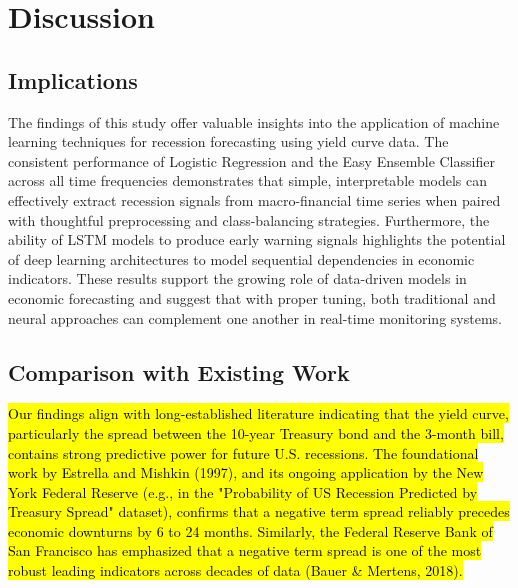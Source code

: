 
\section{Discussion}

\begin{comment}
\begin{itemize}
    \item Implications: Discuss the broader implications of your findings for the field.
    \item Comparison with Existing Work: Compare your results to the literature or previous studies you reviewed.
    \item Limitations: Acknowledge any limitations in your study (e.g., sample size, methodology constraints).
\end{itemize}
\end{comment}








\subsection{Implications}

The findings of this study offer valuable insights into the application of machine learning techniques for recession forecasting using yield curve data. The consistent performance of Logistic Regression and the Easy Ensemble Classifier across all time frequencies demonstrates that simple, interpretable models can effectively extract recession signals from macro-financial time series when paired with thoughtful preprocessing and class-balancing strategies. Furthermore, the ability of LSTM models %
to produce early warning signals highlights the potential of deep learning architectures to model sequential dependencies in economic indicators. These results support the growing role of data-driven models in economic forecasting and suggest that with proper tuning, both traditional and neural approaches can complement one another in real-time monitoring systems.


\subsection{Comparison with Existing Work}

\hl{Our findings align with long-established literature indicating that the yield curve, particularly the spread between the 10-year Treasury bond and the 3-month bill, contains strong predictive power for future U.S. recessions. The foundational work by Estrella and Mishkin (1997), and its ongoing application by the New York Federal Reserve (e.g., in the "Probability of US Recession Predicted by Treasury Spread" dataset), confirms that a negative term spread reliably precedes economic downturns by 6 to 24 months. Similarly, the Federal Reserve Bank of San Francisco has emphasized that a negative term spread is one of the most robust leading indicators across decades of data (Bauer \& Mertens, 2018).}

